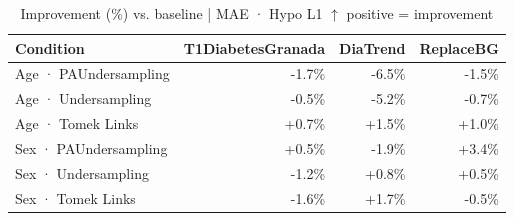\begin{table}[htbp]
\centering
\small
\caption{Improvement (\%) vs. baseline  |  MAE · Hypo L1  $\uparrow$ positive = improvement}
\label{tab:delta_mae_tbr_1_family_size_undersampling}
\begin{tabular}{lrrr}
\toprule
\textbf{Condition} & \textbf{T1DiabetesGranada} & \textbf{DiaTrend} & \textbf{ReplaceBG} \\
\midrule
Age · PAUndersampling & \textcolor{BrickRed}{-1.7\%} & \textcolor{BrickRed}{-6.5\%} & \textcolor{BrickRed}{-1.5\%} \\
Age · Undersampling & \textcolor{BrickRed}{-0.5\%} & \textcolor{BrickRed}{-5.2\%} & \textcolor{BrickRed}{-0.7\%} \\
Age · Tomek Links & \textcolor{OliveGreen}{+0.7\%} & \textcolor{OliveGreen}{+1.5\%} & \textcolor{OliveGreen}{+1.0\%} \\
\midrule
Sex · PAUndersampling & \textcolor{OliveGreen}{+0.5\%} & \textcolor{BrickRed}{-1.9\%} & \textcolor{OliveGreen}{+3.4\%} \\
Sex · Undersampling & \textcolor{BrickRed}{-1.2\%} & \textcolor{OliveGreen}{+0.8\%} & \textcolor{OliveGreen}{+0.5\%} \\
Sex · Tomek Links & \textcolor{BrickRed}{-1.6\%} & \textcolor{OliveGreen}{+1.7\%} & \textcolor{BrickRed}{-0.5\%} \\
\bottomrule
\end{tabular}
\end{table}